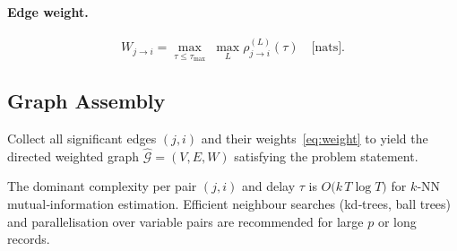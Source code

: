 \documentclass[14pt]{extarticle}
\begin{document}
	\paragraph{Edge weight.}
	\begin{equation}
		W_{j\to i}=
		\max_{\tau\le\tau_{\max}}\;
		\max_{L}\rho_{j\to i}^{(L)}(\tau)
		\quad\bigl[\text{nats}\bigr].
		\label{eq:weight}
	\end{equation}
	
	\subsection{Graph Assembly}
	Collect all significant edges $(j,i)$ and their weights~\eqref{eq:weight}
	to yield the directed weighted graph
	$\widehat{\mathcal G}=(V,E,W)$ satisfying the problem statement.
	
	The dominant complexity per pair $(j,i)$ and delay $\tau$ is
	$O\!\bigl(k\,T\log T\bigr)$ for $k$‑NN mutual‑information estimation.
	Efficient neighbour searches (kd‑trees, ball trees) and parallelisation
	over variable pairs are recommended for large $p$ or long records.
	
\end{document}
